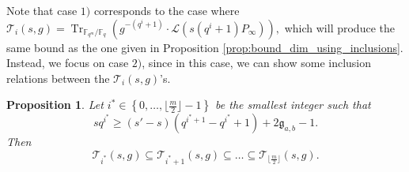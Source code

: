 \documentclass[a4paper]{article}
\newtheorem{proposition}[thm]{Proposition}
\theoremstyle{definition}
\theoremstyle{remark}
\newcommand{\calL}{\mathcal{L}}
\newcommand{\calT}{\mathcal{T}}
\newcommand{\fq}{\mathbb{F}_{q}}
\newcommand{\Tr}[1]{\operatorname{Tr}_{\mathbb{F}_{q^m}/\fq}\left(#1\right)}
\newcommand{\set}[1]{\left\{#1\right\}}
\begin{document}
Note that case $\textit{1)}$ corresponds to the case where $\calT_i(s,g) = \Tr{g^{-(q^i+1)}\cdot \calL(s(q^i+1)P_\infty)}, $ which will produce the same bound as the one given in Proposition \ref{prop:bound_dim_using_inclusions}.
Instead, we focus on case $\textit{2)}$, since in this case, we can show some inclusion relations between the $\calT_i(s,g)$'s.


\begin{proposition} \label{prop:inclusion_T_i's} Let $i^* \in \set{0,\dots,\lfloor\frac{m}{2}\rfloor-1}$ be the smallest integer such that 
\begin{equation} \label{eq:cond_s_s'_i_star}
sq^{i^*} \geq (s'-s)(q^{i^*+1}-q^{i^{*}}+1)+2\mathfrak{g}_{a,b}-1.
\end{equation} 
Then
$$\calT_{i^*}(s,g) \subseteq \calT_{i^*+1}(s,g) \subseteq \dots \subseteq \calT_{\lfloor \frac{m}{2}\rfloor}(s,g).$$
\end{proposition}
\end{document}

